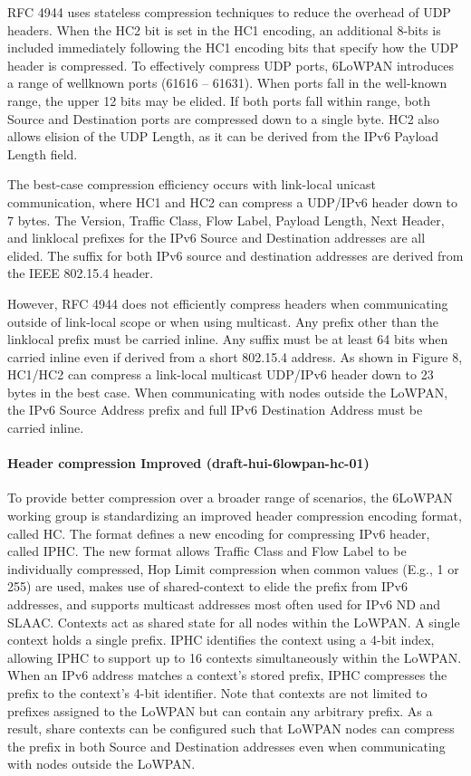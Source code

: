 RFC 4944 uses stateless compression techniques to reduce the overhead of UDP headers.
When the HC2 bit is set in the HC1 encoding,
	an additional 8-bits is included immediately following the HC1 encoding bits that specify how the UDP header is compressed.
To effectively compress UDP ports, 6LoWPAN introduces a range of wellknown ports (61616 – 61631).
When ports fall in the well-known range,
	the upper 12 bits may be elided.
If both ports fall within range,
	both Source and Destination ports are compressed down to a single byte.
HC2 also allows elision of the UDP Length,
	as it can be derived from the IPv6 Payload Length field.

The best-case compression efficiency occurs with link-local unicast communication,
	where HC1 and HC2 can compress a UDP/IPv6 header down to 7 bytes.
The Version,
	Traffic Class,
	Flow Label,
	Payload Length,
	Next Header,
	and linklocal prefixes for the IPv6 Source and Destination addresses are all elided.
The suffix for both IPv6 source and destination addresses are derived from the IEEE 802.15.4 header.

However,
	RFC 4944 does not efficiently compress headers when communicating outside of link-local scope or when using multicast.
Any prefix other than the linklocal prefix must be carried inline.
Any suffix must be at least 64 bits when carried inline even if derived from a short 802.15.4 address.
As shown in Figure 8,
	HC1/HC2 can compress a link-local multicast UDP/IPv6 header down to 23 bytes in the best case.
When communicating with nodes outside the LoWPAN,
	the IPv6 Source Address prefix and full IPv6 Destination Address must be carried inline.

\paragraph{Header compression Improved (draft-hui-6lowpan-hc-01)}

To provide better compression over a broader range of scenarios,
	the 6LoWPAN working group is standardizing an improved header compression encoding format,
	called HC.
The format defines a new encoding for compressing IPv6 header,
	called IPHC.
The new format allows Traffic Class and Flow Label to be individually compressed,
	Hop Limit compression when common values (E.g., 1 or 255) are used,
	makes use of shared-context to elide the prefix from IPv6 addresses,
	and supports multicast addresses most often used for IPv6 ND and SLAAC.
Contexts act as shared state for all nodes within the LoWPAN.
A single context holds a single prefix.
IPHC identifies the context using a 4-bit index,
	allowing IPHC to support up to 16 contexts simultaneously within the LoWPAN.
When an IPv6 address matches a context’s stored prefix,
	IPHC compresses the prefix to the context’s 4-bit identifier.
Note that contexts are not limited to prefixes assigned to the LoWPAN but can contain any arbitrary prefix.
As a result,
	share contexts can be configured such that LoWPAN nodes can compress the prefix in both Source and Destination addresses even when communicating with nodes outside the LoWPAN.


